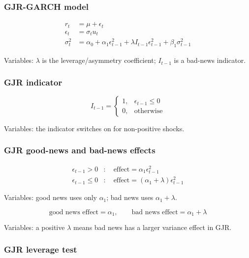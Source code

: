 \documentclass[
  8pt,
  twocolumn]{extarticle}
\begin{document}
\subsubsection{GJR-GARCH model}\label{gjr-garch-model}

\[
\begin{aligned}
r_t&=\mu+\epsilon_t\\
\epsilon_t&=\sigma_tu_t\\
\sigma_t^2&=\alpha_0+\alpha_1\epsilon_{t-1}^2+\lambda I_{t-1}\epsilon_{t-1}^2+\beta_1\sigma_{t-1}^2
\end{aligned}
\]

Variables: \(\lambda\) is the leverage/asymmetry coefficient;
\(I_{t-1}\) is a bad-news indicator.

\subsubsection{GJR indicator}\label{gjr-indicator}

\[
I_{t-1}=
\begin{cases}
1,&\epsilon_{t-1}\le0\\
0,&\text{otherwise}
\end{cases}
\]

Variables: the indicator switches on for non-positive shocks.

\subsubsection{GJR good-news and bad-news
effects}\label{gjr-good-news-and-bad-news-effects}

\[
\begin{aligned}
\epsilon_{t-1}>0&:\quad \text{effect}=\alpha_1\epsilon_{t-1}^2\\
\epsilon_{t-1}\le0&:\quad \text{effect}=(\alpha_1+\lambda)\epsilon_{t-1}^2
\end{aligned}
\]

Variables: good news uses only \(\alpha_1\); bad news uses
\(\alpha_1+\lambda\).

\[
\text{good news effect}=\alpha_1,\qquad \text{bad news effect}=\alpha_1+\lambda
\]

Variables: a positive \(\lambda\) means bad news has a larger variance
effect in GJR.

\subsubsection{GJR leverage test}\label{gjr-leverage-test}
\end{document}
